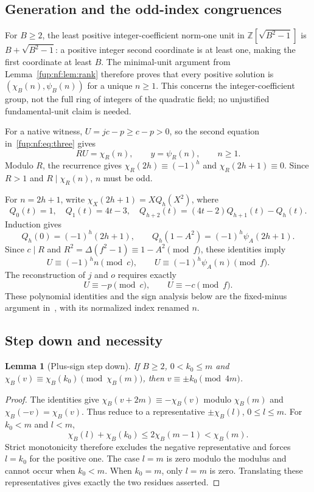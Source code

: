 \documentclass[11pt,letterpaper]{article}
\newtheorem{lemma}[theorem]{Lemma}
\theoremstyle{definition}\newtheorem{definition}[theorem]{Definition}
\theoremstyle{remark}\newtheorem{remark}[theorem]{Remark}
\newcommand{\Z}{\mathbb Z}\newcommand{\Np}{\mathbb Z_{>0}}
\begin{document}
\subsection{Generation and the odd-index congruences}
For $B\ge2$, the least positive integer-coefficient norm-one unit in $\Z[\sqrt{B^2-1}]$ is $B+\sqrt{B^2-1}$: a positive integer second coordinate is at least one, making the first coordinate at least $B$. The minimal-unit argument from Lemma~\ref{fup:nf:lem:rank} therefore proves that every positive solution is $(\chi_B(n),\psi_B(n))$ for a unique $n\ge1$. This concerns the integer-coefficient group, not the full ring of integers of the quadratic field; no unjustified fundamental-unit claim is needed.

For a native witness, $U=jc-p\ge c-p>0$, so the second equation in~\eqref{fup:nf:eq:three} gives
\begin{equation}\label{fup:nf:eq:normalizedpell}
 RU=\chi_R(n),\qquad y=\psi_R(n),\qquad n\ge1.
\end{equation}
Modulo $R$, the recurrence gives
$\chi_R(2h)\equiv(-1)^h$ and $\chi_R(2h+1)\equiv0$.
Since $R>1$ and $R\mid\chi_R(n)$, $n$ must be odd.

For $n=2h+1$, write $\chi_X(2h+1)=XQ_h(X^2)$, where
\[
 Q_0(t)=1,\quad Q_1(t)=4t-3,\quad
 Q_{h+2}(t)=(4t-2)Q_{h+1}(t)-Q_h(t).
\]
Induction gives
\[
 Q_h(0)=(-1)^h(2h+1),\qquad
 Q_h(1-A^2)=(-1)^h\psi_A(2h+1).
\]
Since $c\mid R$ and $R^2=\Delta(f^2-1)\equiv1-A^2\pmod f$, these identities imply
\begin{equation}\label{fup:nf:eq:congruences}
 U\equiv(-1)^h n\pmod c,\qquad
 U\equiv(-1)^h\psi_A(n)\pmod f.
\end{equation}
The reconstruction of $j$ and $o$ requires exactly
\begin{equation}\label{fup:nf:eq:minuses}
 U\equiv-p\pmod c,\qquad U\equiv-c\pmod f.
\end{equation}
These polynomial identities and the sign analysis below are the fixed-minus argument in~\cite{fup:nf:parity}, with its normalized index renamed $n$.

\subsection{Step down and necessity}
\begin{lemma}[Plus-sign step down]\label{fup:nf:lem:step}
If $B\ge2$, $0<k_0\le m$ and
$\chi_B(v)\equiv\chi_B(k_0)\pmod{\chi_B(m)}$, then
$v\equiv\pm k_0\pmod{4m}$.
\end{lemma}
\begin{proof}
The identities give $\chi_B(v+2m)\equiv-\chi_B(v)$ modulo $\chi_B(m)$ and $\chi_B(-v)=\chi_B(v)$. Thus reduce to a representative $\pm\chi_B(l)$, $0\le l\le m$. For $k_0<m$ and $l<m$,
\[
 \chi_B(l)+\chi_B(k_0)\le2\chi_B(m-1)<\chi_B(m).
\]
Strict monotonicity therefore excludes the negative representative and forces $l=k_0$ for the positive one. The case $l=m$ is zero modulo the modulus and cannot occur when $k_0<m$. When $k_0=m$, only $l=m$ is zero. Translating these representatives gives exactly the two residues asserted.
\end{proof}
\end{document}
